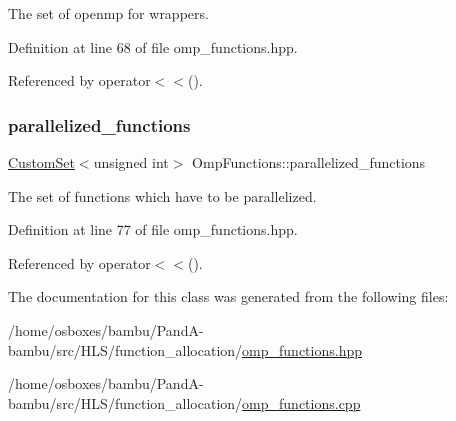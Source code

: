 The set of openmp for wrappers. 



Definition at line 68 of file omp\+\_\+functions.\+hpp.



Referenced by operator$<$$<$().

\mbox{\label{classOmpFunctions_a9035fe9e0b8711fe07c83ef7257728a0}} 
\subsubsection{\texorpdfstring{parallelized\+\_\+functions}{parallelized\_functions}}
{\footnotesize\ttfamily \hyperlink{custom__set_8hpp_a615bc2f42fc38a4bb1790d12c759e86f}{Custom\+Set}$<$unsigned int$>$ Omp\+Functions\+::parallelized\+\_\+functions}



The set of functions which have to be parallelized. 



Definition at line 77 of file omp\+\_\+functions.\+hpp.



Referenced by operator$<$$<$().



The documentation for this class was generated from the following files\+:\begin{DoxyCompactItemize}
\item 
/home/osboxes/bambu/\+Pand\+A-\/bambu/src/\+H\+L\+S/function\+\_\+allocation/\hyperlink{omp__functions_8hpp}{omp\+\_\+functions.\+hpp}\item 
/home/osboxes/bambu/\+Pand\+A-\/bambu/src/\+H\+L\+S/function\+\_\+allocation/\hyperlink{omp__functions_8cpp}{omp\+\_\+functions.\+cpp}\end{DoxyCompactItemize}
